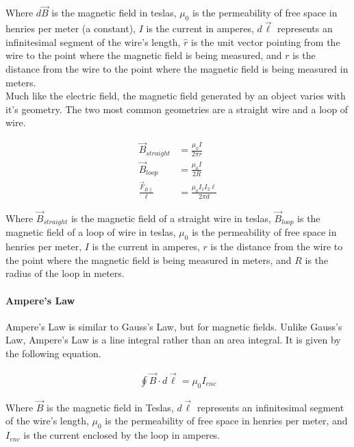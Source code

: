 Where $d\vec{B}$ is the magnetic field in teslas, $\mu_0$ is the permeability of free space in henries per meter (a constant), 
$I$ is the current in amperes, $d\vec{\ell}$ represents an infinitesimal segment of the wire's length, $\hat{r}$ is the unit vector 
pointing from the wire to the point where the magnetic field is being measured, and $r$ is the distance from the wire to the point where 
the magnetic field is being measured in meters.\\

Much like the electric field, the magnetic field generated by an object varies with it's geometry. The two most common geometries are a straight 
wire and a loop of wire.

\begin{align*}
    \vec{B}_{straight} &= \frac{\mu_0 I}{2\pi r}\\
    \vec{B}_{loop} &= \frac{\mu_0 I}{2R}\\
    \frac{\vec{F}_{B\parallel}}{\ell} &= \frac{\mu_0 I_1 I_2 \ell}{2\pi d}
\end{align*}

Where $\vec{B}_{straight}$ is the magnetic field of a straight wire in teslas, $\vec{B}_{loop}$ is the magnetic field of a loop of wire in teslas,
$\mu_0$ is the permeability of free space in henries per meter, $I$ is the current in amperes, $r$ is the distance from the wire to the point where
the magnetic field is being measured in meters, and $R$ is the radius of the loop in meters.\\


\paragraph*{Ampere's Law}
Ampere's Law is similar to Gauss's Law, but for magnetic fields. Unlike Gauss's Law, Ampere's Law is a line integral rather than an area integral. 
It is given by the following equation.

\begin{align*}
    \oint \vec{B} \cdot d\vec{\ell} = \mu_0 I_{enc}
\end{align*}

Where $\vec{B}$ is the magnetic field in Teslas, $d\vec{\ell}$ represents an infinitesimal segment of the wire's length, $\mu_0$ is the 
permeability of free space in henries per meter, and $I_{enc}$ is the current enclosed by the loop in amperes.\\

